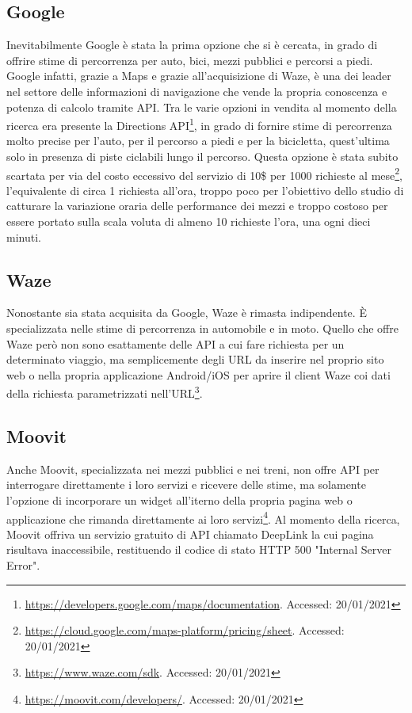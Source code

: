 \subsection{Google}

Inevitabilmente Google è stata la prima opzione che si è cercata, in grado di offrire stime di percorrenza per auto, bici, mezzi pubblici e percorsi a piedi. Google infatti, grazie a Maps e grazie all'acquisizione di Waze, è una dei leader nel settore delle informazioni di navigazione che vende la propria conoscenza e potenza di calcolo tramite API. Tra le varie opzioni in vendita al momento della ricerca era presente la Directions API\footnote{\url{https://developers.google.com/maps/documentation}. Accessed: 20/01/2021}, in grado di fornire stime di percorrenza molto precise per l'auto, per il percorso a piedi e per la bicicletta, quest'ultima solo in presenza di piste ciclabili lungo il percorso. Questa opzione è stata subito scartata per via del costo eccessivo del servizio di 10\$ per 1000 richieste al mese\footnote{\url{https://cloud.google.com/maps-platform/pricing/sheet}. Accessed: 20/01/2021}, l'equivalente di circa 1 richiesta all'ora, troppo poco per l'obiettivo dello studio di catturare la variazione oraria delle performance dei mezzi e troppo costoso per essere portato sulla scala voluta di almeno 10 richieste l'ora, una ogni dieci minuti.

\subsection{Waze}

Nonostante sia stata acquisita da Google, Waze è rimasta indipendente. È specializzata nelle stime di percorrenza in automobile e in moto. Quello che offre Waze però non sono esattamente delle API a cui fare richiesta per un determinato viaggio, ma semplicemente degli URL da inserire nel proprio sito web o nella propria applicazione Android/iOS per aprire il client Waze coi dati della richiesta parametrizzati nell'URL\footnote{\url{https://www.waze.com/sdk}. Accessed: 20/01/2021}.

\subsection{Moovit}

Anche Moovit, specializzata nei mezzi pubblici e nei treni, non offre API per interrogare direttamente i loro servizi e ricevere delle stime, ma solamente l'opzione di incorporare un widget all'iterno della propria pagina web o applicazione che rimanda direttamente ai loro servizi\footnote{\url{https://moovit.com/developers/}. Accessed: 20/01/2021}. Al momento della ricerca, Moovit offriva un servizio gratuito di API chiamato DeepLink la cui pagina risultava inaccessibile, restituendo il codice di stato HTTP 500 "Internal Server Error".

